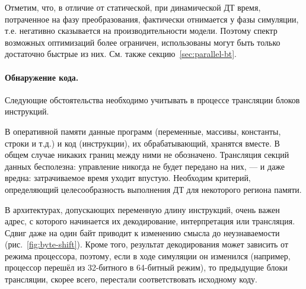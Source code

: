 Отметим, что, в отличие от статической, при динамической ДТ время, потраченное на фазу преобразования, фактически отнимается у фазы симуляции, т.е. негативно сказывается на производительности модели. Поэтому спектр возможных оптимизаций более ограничен, использованы могут быть только достаточно быстрые из них. См. также секцию~\ref{sec:parallel-bt}.

\paragraph{Обнаружение кода.} Следующие обстоятельства необходимо учитывать в процессе трансляции блоков инструкций.

\begin{itemize*}
    \item В оперативной памяти данные программ (переменные, массивы, константы, строки и т.д.) и код (инструкции), их обрабатывающий, хранятся вместе. В общем случае никаких границ между ними не обозначено. Трансляция секций данных бесполезна: управление никогда не будет передано на них, --- и даже вредна: затрачиваемое время уходит впустую. Необходим критерий, определяющий целесообразность выполнения ДТ для некоторого региона памяти.
    
    \item В архитектурах, допускающих переменную длину инструкций, очень важен адрес, с которого начинается их декодирование, интерпретация или трансляция. Сдвиг даже на один байт приводит к изменению смысла до неузнаваемости (рис.~\ref{fig:byte-shift}). Кроме того, результат декодирования может зависить от режима процессора, поэтому, если в ходе симуляции он изменился (например, процессор перешёл из 32-битного в 64-битный режим), то предыдущие блоки трансляции, скорее всего, перестали соответствовать исходному коду.
\end{itemize*}


